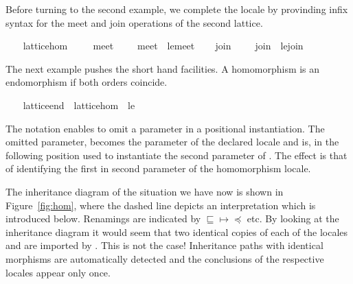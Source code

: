 \begin{isabellebody}
\begin{isamarkuptext}
  Before turning to the second example, we complete the locale by
  provinding infix syntax for the meet and join operations of the
  second lattice.%
\end{isamarkuptext}%
\isamarkuptrue%
\ \ \isamarkupfalse%
\ lattice{\isacharunderscore}hom\ \isanewline
\ \ \isamarkupfalse%
\ meet{\isacharprime}\ {\isacharparenleft}\ {\isachardoublequoteopen}{\isasymsqinter}{\isacharprime}{\isacharprime}{\isachardoublequoteclose}\ {}{}{\isacharparenright}\ \ {\isachardoublequoteopen}meet{\isacharprime}\ {\isasymequiv}\ le{\isacharprime}{\isachardot}meet{\isachardoublequoteclose}\isanewline
\ \ \isamarkupfalse%
\ join{\isacharprime}\ {\isacharparenleft}\ {\isachardoublequoteopen}{\isasymsqunion}{\isacharprime}{\isacharprime}{\isachardoublequoteclose}\ {}{}{\isacharparenright}\ \ {\isachardoublequoteopen}join{\isacharprime}\ {\isasymequiv}\ le{\isacharprime}{\isachardot}join{\isachardoublequoteclose}\isanewline
\ \ \isamarkupfalse%
%
\begin{isamarkuptext}%
The next example pushes the short hand facilities.  A
  homomorphism is an endomorphism if both orders coincide.%
\end{isamarkuptext}%
\isamarkuptrue%
\ \ \isamarkupfalse%
\ lattice{\isacharunderscore}end\ {\isacharequal}\ lattice{\isacharunderscore}hom\ {\isacharunderscore}\ le%
\begin{isamarkuptext}%
The notation \isa{{\isacharunderscore}} enables to omit a parameter in a
  positional instantiation.  The omitted parameter,  becomes
  the parameter of the declared locale and is, in the following
  position used to instantiate the second parameter of .  The effect is that of identifying the first in second
  parameter of the homomorphism locale.%
\end{isamarkuptext}%
\isamarkuptrue%
%
\begin{isamarkuptext}%
The inheritance diagram of the situation we have now is shown
  in Figure~\ref{fig:hom}, where the dashed line depicts an
  interpretation which is introduced below.  Renamings are
  indicated by $\sqsubseteq \mapsto \preceq$ etc.  By looking at the
  inheritance diagram it would seem
  that two identical copies of each of the locales  and  are imported by .  This is not the case!  Inheritance paths with
  identical morphisms are automatically detected and
  the conclusions of the respective locales appear only once.


\end{isamarkuptext}
\end{isabellebody}
